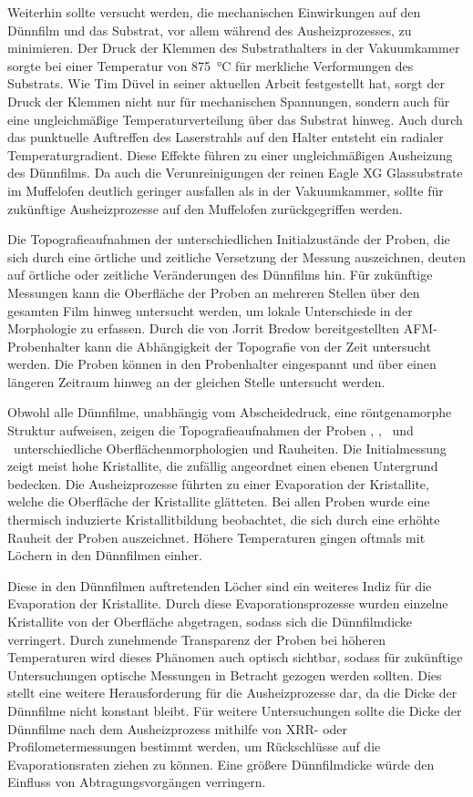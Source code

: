 Weiterhin sollte versucht werden, die mechanischen Einwirkungen auf den Dünnfilm und das Substrat, vor allem
während des Ausheizprozesses, zu minimieren.
Der Druck der Klemmen des Substrathalters in der Vakuumkammer sorgte bei einer Temperatur von \qty{875}{\degreeCelsius}
für merkliche Verformungen des Substrats.
Wie Tim Düvel in seiner aktuellen Arbeit festgestellt hat, sorgt der Druck der Klemmen nicht nur für
mechanischen Spannungen, sondern auch für eine ungleichmäßige Temperaturverteilung über das Substrat hinweg.
Auch durch das punktuelle Auftreffen des Laserstrahls auf den Halter entsteht ein radialer Temperaturgradient.
Diese Effekte führen zu einer ungleichmäßigen Ausheizung des Dünnfilms.
Da auch die Verunreinigungen der reinen Eagle XG Glassubstrate im Muffelofen deutlich geringer ausfallen als in der
Vakuumkammer, sollte für zukünftige Ausheizprozesse auf den Muffelofen zurückgegriffen werden.

Die Topografieaufnahmen der unterschiedlichen Initialzustände der Proben, die sich durch eine örtliche und zeitliche
Versetzung der Messung auszeichnen, deuten auf örtliche oder zeitliche Veränderungen des Dünnfilms hin.
Für zukünftige Messungen kann die Oberfläche der Proben an mehreren Stellen über den gesamten Film hinweg
untersucht werden, um lokale Unterschiede in der Morphologie zu erfassen.
Durch die von Jorrit Bredow bereitgestellten AFM-Probenhalter kann die Abhängigkeit der Topografie von der Zeit
untersucht werden.
Die Proben können in den Probenhalter eingespannt und über einen längeren Zeitraum hinweg an der gleichen Stelle
untersucht werden.

Obwohl alle Dünnfilme, unabhängig vom Abscheidedruck, eine röntgenamorphe Struktur aufweisen, zeigen die
Topografieaufnahmen der Proben \samplethree, \sampleone, \sampletwo\ und \samplefour\ unterschiedliche
Oberflächenmorphologien und Rauheiten.
Die Initialmessung zeigt meist hohe Kristallite, die zufällig angeordnet einen ebenen Untergrund bedecken.
Die Ausheizprozesse führten zu einer Evaporation der Kristallite, welche die Oberfläche der Kristallite glätteten.
Bei allen Proben wurde eine thermisch induzierte Kristallitbildung beobachtet, die sich durch eine erhöhte Rauheit
der Proben auszeichnet.
Höhere Temperaturen gingen oftmals mit Löchern in den Dünnfilmen einher.

Diese in den Dünnfilmen auftretenden Löcher sind ein weiteres Indiz für die Evaporation der Kristallite.
Durch diese Evaporationsprozesse wurden einzelne Kristallite von der Oberfläche abgetragen, sodass sich die
Dünnfilmdicke verringert.
Durch zunehmende Transparenz der Proben bei höheren Temperaturen wird dieses Phänomen auch optisch sichtbar,
sodass für zukünftige Untersuchungen optische Messungen in Betracht gezogen werden sollten.
Dies stellt eine weitere Herausforderung für die Ausheizprozesse dar, da die Dicke der Dünnfilme nicht konstant bleibt.
Für weitere Untersuchungen sollte die Dicke der Dünnfilme nach dem Ausheizprozess mithilfe von XRR- oder
Profilometermessungen bestimmt werden, um Rückschlüsse auf die Evaporationsraten ziehen zu können.
Eine größere Dünnfilmdicke würde den Einfluss von Abtragungsvorgängen verringern.

